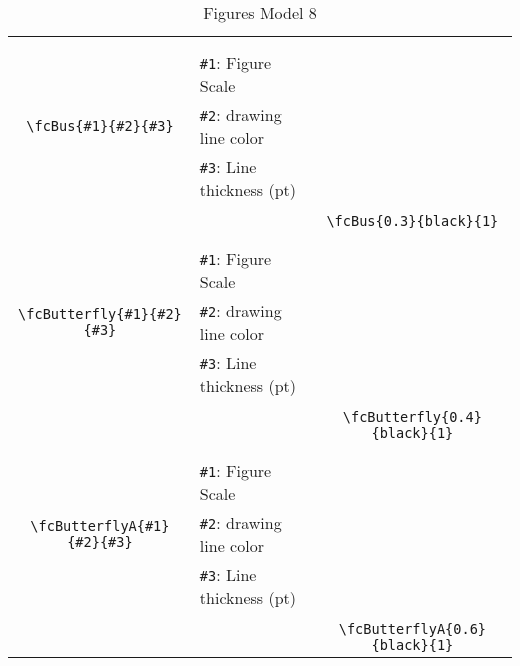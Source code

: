 \documentclass[x11names]{article}
\begin{document}
\begin{table}[H]
\begin{tabular}{|c|l|c|}
	&&\multirow{5}{*}{\fcBus{0.3}{black}{1}}\\	&&\\	&\verb|#1|: Figure Scale &\\	\verb|\fcBus{#1}{#2}{#3}|&	\verb|#2|: drawing line color &\\	&\verb|#3|: Line thickness (pt) &\\ &&\\&&	\verb|\fcBus{0.3}{black}{1}|\\\hline 	
	&&\multirow{5}{*}{\fcButterfly{0.4}{black}{1}}\\	&&\\	&\verb|#1|: Figure Scale &\\	\verb|\fcButterfly{#1}{#2}{#3}|&	\verb|#2|: drawing line color &\\	&\verb|#3|: Line thickness (pt) &\\ &&\\&&	\verb|\fcButterfly{0.4}{black}{1}|\\\hline 	
	&&\multirow{5}{*}{\fcButterflyA{0.6}{black}{1}}\\	&&\\	&\verb|#1|: Figure Scale &\\	\verb|\fcButterflyA{#1}{#2}{#3}|&	\verb|#2|: drawing line color &\\	&\verb|#3|: Line thickness (pt) &\\ &&\\&&	\verb|\fcButterflyA{0.6}{black}{1}|\\\hline 	\hline\end{tabular}\caption{Figures Model 8}\label{tab8}\end{table}
\end{document}
